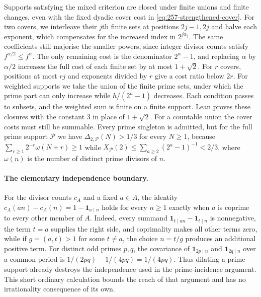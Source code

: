 Supports satisfying the mixed criterion are closed under finite unions
and finite changes, even with the fixed dyadic cover cost in
\eqref{eq:257-strengthened-cover}. For two covers, we interleave their $j$th finite sets at positions
$2j-1,2j$ and halve each exponent, which compensates for the increased
index in $2^{j\alpha_j}$. The same coefficients still majorise the
smaller powers, since integer divisor counts satisfy
$f^{\alpha/2}\le f^\alpha$. The only remaining cost is the denominator
$2^\alpha-1$, and replacing $\alpha$ by $\alpha/2$ increases the full cost
of each finite set by at most $1+\sqrt2$.  For $r$ covers, positions at most $rj$ and
exponents divided by $r$ give a cost ratio below $2r$.  For weighted supports we take the union of the finite prime sets, under
which the prime part can only increase while $h/(2^h-1)$ decreases. Each
condition passes to subsets, and the weighted sum is finite on a finite
support.
\href{https://github.com/wcook04/plectis-erdos/blob/3973d3b10bce72017b8f60093f0d6c3f4f592d80/lean/ErdosProblems/Erdos257/PaperCompleteR8/StrengthenedCoverFiniteUnion.lean#L167}{Lean proves}
these closures with the constant $3$ in place of $1+\sqrt2$.
For a countable union the cover costs must still be summable. Every
prime singleton is admitted, but for the full prime support $\mathcal P$
we have $\Delta_{2,\mathcal P}(N)>1/3$ for every $N\ge1$, because
$\sum_{r\ge1}2^{-r}\omega(N+r)\ge1$ while
$X_{\mathcal P}(2)\le\sum_{a\ge2}(2^a-1)^{-1}<2/3$, where $\omega(n)$ is
the number of distinct prime divisors of $n$.

\paragraph{The elementary independence boundary.}
For the divisor counts $c_A$ and a fixed $a\in A$,
the identity $c_A(an)-c_A(n)=1-\mathbf1_{a\mid n}$ holds for every
$n\ge1$ exactly when $a$ is coprime to every other member of $A$.
Indeed, every summand $\mathbf1_{t\mid an}-\mathbf1_{t\mid n}$ is
nonnegative, the term $t=a$ supplies the right side, and coprimality
makes all other terms zero, while if $g=(a,t)>1$ for some $t\ne a$, the
choice $n=t/g$ produces an additional positive term.  For distinct odd primes $p,q$, the covariance of
$\mathbf1_{2p\mid n}$ and $\mathbf1_{2q\mid n}$ over a common period is
$1/(2pq)-1/(4pq)=1/(4pq)$.  Thus dilating a prime support already destroys
the independence used in the prime-incidence argument.  This short ordinary
calculation bounds the reach of that argument and has no irrationality
consequence of its own.

